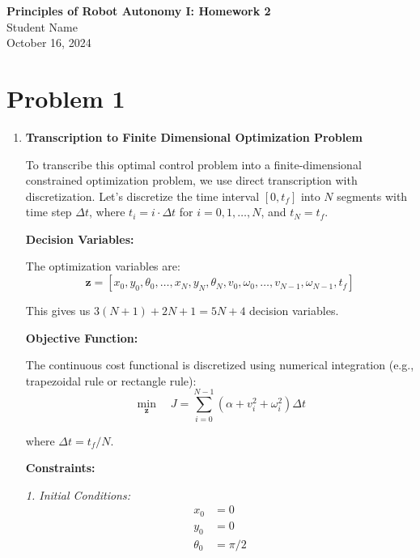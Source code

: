 \documentclass [11pt]{article}
\newcommand{\authorname}{Student Name}
\newcommand{\datenumber}{October 16, 2024}
\newcommand{\assignmentID}{Homework 2}
\newcommand{\coursename}{Principles of Robot Autonomy I: }
\begin{document}
\pagestyle{fancy}

\begin{center}
    \Large \textbf{\coursename \assignmentID}\\
    \small \authorname\\
    \small \datenumber
\end{center}


\section*{Problem 1}
    \begin{enumerate}[label=(\roman*)]
        \item \textbf{Transcription to Finite Dimensional Optimization Problem}

        To transcribe this optimal control problem into a finite-dimensional constrained optimization problem, we use direct transcription with discretization. Let's discretize the time interval $[0, t_f]$ into $N$ segments with time step $\Delta t$, where $t_i = i \cdot \Delta t$ for $i = 0, 1, \ldots, N$, and $t_N = t_f$.

        \textbf{Decision Variables:}

        The optimization variables are:
        \begin{equation}
        \mathbf{z} = [x_0, y_0, \theta_0, \ldots, x_N, y_N, \theta_N, v_0, \omega_0, \ldots, v_{N-1}, \omega_{N-1}, t_f]
        \end{equation}

        This gives us $3(N+1) + 2N + 1 = 5N + 4$ decision variables.

        \textbf{Objective Function:}

        The continuous cost functional is discretized using numerical integration (e.g., trapezoidal rule or rectangle rule):
        \begin{equation}
        \min_{\mathbf{z}} \quad J = \sum_{i=0}^{N-1} \left(\alpha + v_i^2 + \omega_i^2\right) \Delta t
        \end{equation}

        where $\Delta t = t_f / N$.

        \textbf{Constraints:}

        \textit{1. Initial Conditions:}
        \begin{align}
        x_0 &= 0 \\
        y_0 &= 0 \\
        \theta_0 &= \pi/2
        \end{align}


\end{enumerate}
\end{document}
